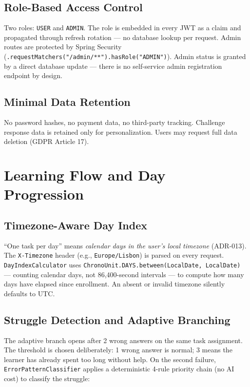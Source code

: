 \subsection{Role-Based Access Control}
\label{ssec:rbac}

Two roles: \texttt{USER} and \texttt{ADMIN}. The role is embedded in every JWT as a claim and propagated through refresh rotation — no database lookup per request. Admin routes are protected by Spring Security (\texttt{.requestMatchers("/admin/**").hasRole("ADMIN")}). Admin status is granted by a direct database update — there is no self-service admin registration endpoint by design.

\subsection{Minimal Data Retention}
\label{ssec:data_minimization}

No password hashes, no payment data, no third-party tracking. Challenge response data is retained only for personalization. Users may request full data deletion (GDPR Article 17).

\section{Learning Flow and Day Progression}
\label{sec:learning_flow}

\subsection{Timezone-Aware Day Index}
\label{ssec:timezone}

``One task per day'' means \emph{calendar days in the user's local timezone} (ADR-013). The \texttt{X-Timezone} header (e.g., \texttt{Europe/Lisbon}) is parsed on every request. \texttt{DayIndexCalculator} uses \texttt{ChronoUnit.DAYS.between(LocalDate, LocalDate)} — counting calendar days, not 86,400-second intervals — to compute how many days have elapsed since enrollment. An absent or invalid timezone silently defaults to UTC.

\subsection{Struggle Detection and Adaptive Branching}
\label{sec:struggle_detect}

The adaptive branch opens after 2 wrong answers on the same task assignment. The threshold is chosen deliberately: 1 wrong answer is normal; 3 means the learner has already spent too long without help. On the second failure, \texttt{ErrorPatternClassifier} applies a deterministic 4-rule priority chain (no AI cost) to classify the struggle:

